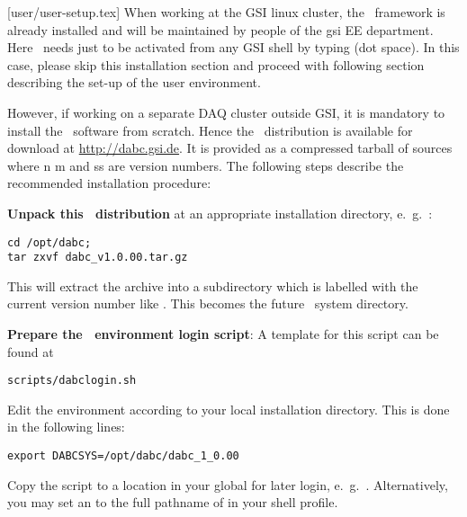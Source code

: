 [user/user-setup.tex]
\label{user-setup-chapter}
When working at the GSI linux cluster, the \dabc\ framework is already installed and will
be maintained by people of the gsi EE department. Here \dabc\ needs just to be
activated from any GSI shell by typing  (dot space). In this case, 
please skip this installation section and proceed with following section  describing
the set-up of the user environment.

However, if working on a separate DAQ cluster outside GSI, 
it is mandatory to install the \dabc\ software
from scratch. 
Hence the \dabc\ distribution is available for download at \hyperref{http://dabc.gsi.de}{}{}{http://dabc.gsi.de}.
It is provided as a compressed tarball of sources 
where n m and ss are version numbers.
The following steps describe the recommended installation procedure:

\bnum
\item {\bf Unpack this \dabc\ distribution} at an appropriate installation directory,
e.~g.~:
\begin{small}
\begin{verbatim}
cd /opt/dabc; 
tar zxvf dabc_v1.0.00.tar.gz
\end{verbatim}
\end{small}
This will extract the archive into a subdirectory which is labelled
with the current version number like .
This becomes the future \dabc\ system directory.

\item {\bf Prepare the \dabc\ environment login script}:
A template for this script can be found at  
\begin{small}
\begin{verbatim}
scripts/dabclogin.sh
\end{verbatim}
\end{small}

\bbul
\item Edit the  environment according to your local installation directory. 
This is done in the following lines:
\begin{small}
\begin{verbatim}
export DABCSYS=/opt/dabc/dabc_1_0.00  
\end{verbatim}  
\end{small}
\item Copy the script to a location in your global  for later login,
e.~g.\ . Alternatively, you
may set an  to the full pathname of  in your shell profile.
\ebul

